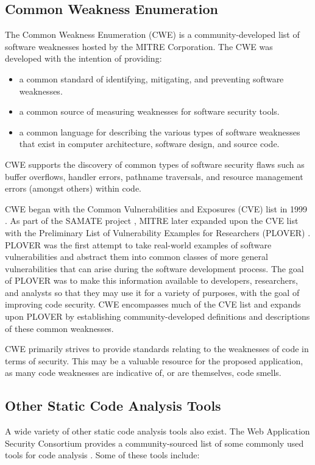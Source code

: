 \documentclass{sig-alternate}
\begin{document}
\subsection{Common Weakness Enumeration}
The Common Weakness Enumeration (CWE) \cite{mitre2006cwe} is a community-developed list of software weaknesses hosted by the MITRE Corporation. The CWE was developed with the intention of providing:

\begin{itemize}
\item a common standard of identifying, mitigating, and preventing software weaknesses.
\item a common source of measuring weaknesses for software security tools.
\item a common language for describing the various types of software weaknesses that exist in computer architecture, software design, and source code.
\end{itemize}

CWE supports the discovery of common types of software security flaws such as buffer overflows, handler errors, pathname traversals, and resource management errors (amongst others) within code.

CWE began with the Common Vulnerabilities and Exposures (CVE) list in 1999 \cite{mitre2005cve}. As part of the SAMATE project \cite{nist2005samate}, MITRE later expanded upon the CVE list with the Preliminary List of Vulnerability Examples for Researchers (PLOVER) \cite{christey2005plover}. PLOVER was the first attempt to take real-world examples of software vulnerabilities and abstract them into common classes of more general vulnerabilities that can arise during the software development process. The goal of PLOVER was to make this information available to developers, researchers, and analysts so that they may use it for a variety of purposes, with the goal of improving code security. CWE encompasses much of the CVE list and expands upon PLOVER by establishing community-developed definitions and descriptions of these common weaknesses.

CWE primarily strives to provide standards relating to the weaknesses of code in terms of security. This may be a valuable resource for the proposed application, as many code weaknesses are indicative of, or are themselves, code smells.

\subsection{Other Static Code Analysis Tools}
A wide variety of other static code analysis tools also exist. The Web Application Security Consortium provides a community-sourced list of some commonly used tools for code analysis \cite{webappsec2012}. Some of these tools include:
\end{document}
